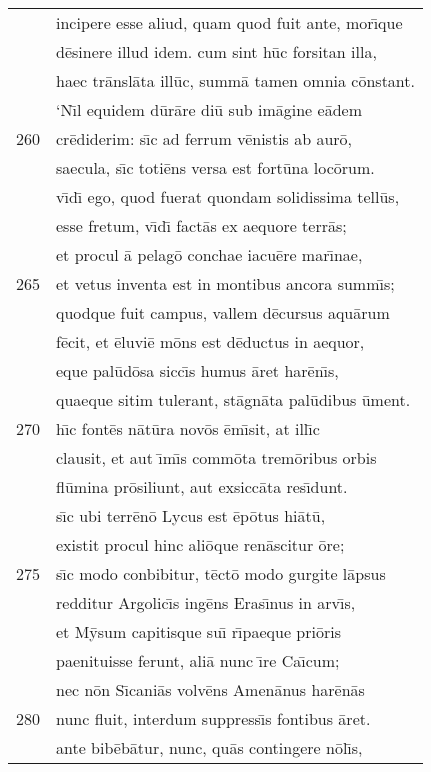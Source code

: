 \documentclass[paper=6in:9in,pagesize=pdftex,
               headinclude=on,footinclude=on,12pt]{scrbook}
\begin{document}
\begin{longtable}[p]{ r l }
 & incipere esse aliud, quam quod fuit ante, mor\={\i}que\\ 
 & d\=esinere illud idem. cum sint h\=uc forsitan illa,\\ 
 & haec tr\=ansl\=ata ill\=uc, summ\=a tamen omnia c\=onstant.\\ 
 & \indent `N\={\i}l equidem d\=ur\=are di\=u sub im\=agine e\=adem\\ 
260 & cr\=ediderim: s\={\i}c ad ferrum v\=enistis ab aur\=o,\\ 
 & saecula, s\={\i}c toti\=ens versa est fort\=una loc\=orum.\\ 
 & v\={\i}d\={\i} ego, quod fuerat quondam solidissima tell\=us,\\ 
 & esse fretum, v\={\i}d\={\i} fact\=as ex aequore terr\=as;\\ 
 & et procul \=a pelag\=o conchae iacu\=ere mar\={\i}nae,\\ 
265 & et vetus inventa est in montibus ancora summ\={\i}s;\\ 
 & quodque fuit campus, vallem d\=ecursus aqu\=arum\\ 
 & f\=ecit, et \=eluvi\=e m\=ons est d\=eductus in aequor,\\ 
 & eque pal\=ud\=osa sicc\={\i}s humus \=aret har\=en\={\i}s,\\ 
 & quaeque sitim tulerant, st\=agn\=ata pal\=udibus \=ument.\\ 
270 & h\={\i}c font\=es n\=at\=ura nov\=os \=em\={\i}sit, at ill\={\i}c\\ 
 & clausit, et aut \={\i}m\={\i}s comm\=ota trem\=oribus orbis\\ 
 & fl\=umina pr\=osiliunt, aut exsicc\=ata res\={\i}dunt.\\ 
 & s\={\i}c ubi terr\=en\=o Lycus est \=ep\=otus hi\=at\=u,\\ 
 & existit procul hinc ali\=oque ren\=ascitur \=ore;\\ 
275 & s\={\i}c modo conbibitur, t\=ect\=o modo gurgite l\=apsus\\ 
 & redditur Argolic\={\i}s ing\=ens Eras\={\i}nus in arv\={\i}s,\\ 
 & et M\=ysum capitisque su\={\i} r\={\i}paeque pri\=oris\\ 
 & paenituisse ferunt, ali\=a nunc \={\i}re Ca\={\i}cum;\\ 
 & nec n\=on S\={\i}cani\=as volv\=ens Amen\=anus har\=en\=as\\ 
280 & nunc fluit, interdum suppress\={\i}s fontibus \=aret.\\ 
 & ante bib\=eb\=atur, nunc, qu\=as contingere n\=ol\={\i}s,\\ 

\end{longtable}
\end{document}
